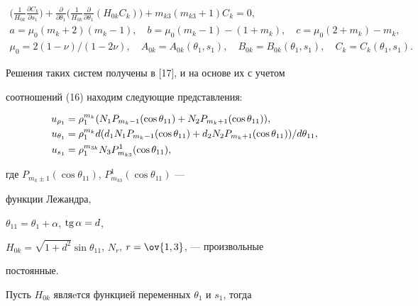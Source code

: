 \begin{gather*}
\bigg(\frac{1}{H_{0k}}\frac{\partial C_k}{\partial s_1} \bigg) 


+\frac{\partial }{\partial \theta_1} 


\bigg(\frac{1}{H_{0k}}\frac{\partial }{\partial \theta_1} 


(H_{0k}C_k)\bigg)+m_{k3}(m_{k3}+1)C_k=0,\\ 


% 


a=\mu_0(m_k+2)(m_k-1),\quad b=\mu_0(m_k-1)-(1+m_k),\quad 


c=\mu_0(2+m_k)-m_k,\\ 


% 


\mu_0=2(1-\nu)/(1-2\nu),\quad A_{0k}=A_{0k}(\theta_1,s_1),\quad 


B_{0k}=B_{0k}(\theta_1,s_1),\quad C_k=C_k(\theta_1,s_1).


\end{gather*} 


 


Решения таких систем получены в [17], и на основе их с учетом  


соотношений (16) находим следующие представления: 


\begin{align} 


u_{\rho_1}&=\rho^{m_k}_1(N_1P_{m_k-1}(\cos\theta_{11})+ 


N_2P_{m_k+1}(\cos\theta_{11})),\notag\\ 


% 


u_{\theta_1}&=\rho^{m_k}_1d(d_1N_1P_{m_k-1}(\cos\theta_{11})+ 


d_2N_2P_{m_k+1}(\cos\theta_{11}))/d\theta_{11},\\ 


% 


u_{s_1}&=\rho^{m_{3k}}_1N_3P^1_{m_{k3}}(\cos\theta_{11}), \notag


\end{align} 


где $P_{m_k\pm1}(\cos\theta_{11})$, $P^1_{m_{k3}}(\cos\theta_{11})$ --- 


функции Лежандра, 


$\theta_{11}=\theta_1+\alpha$, $\operatorname{tg}\alpha=d$, 


$H_{0k}=\sqrt{1+d^2}\sin\theta_{11}$, $N_r$, $r=\ov{1,3}$, --- произвольные 


постоянные. 


Пусть $H_{0k}$ являeтся функцией переменных $\theta_1$ и $s_1$, тогда 


